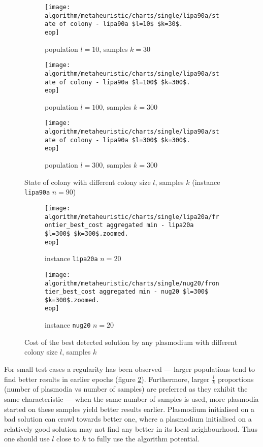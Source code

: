 \begin{figure}
  \centering

  \begin{subfigure}{\textwidth}
    \texttt{[image: algorithm/metaheuristic/charts/single/lipa90a/state of colony - lipa90a \$l=10\$ \$k=30\$.\\eop]}
    \caption{population $l=10$, samples $k=30$}
  \end{subfigure}
  \par\bigskip
  \begin{subfigure}{\textwidth}
    \texttt{[image: algorithm/metaheuristic/charts/single/lipa90a/state of colony - lipa90a \$l=100\$ \$k=300\$.\\eop]}
    \caption{population $l=100$, samples $k=300$}
  \end{subfigure}
  \par\bigskip
  \begin{subfigure}{\textwidth}
    \texttt{[image: algorithm/metaheuristic/charts/single/lipa90a/state of colony - lipa90a \$l=300\$ \$k=300\$.\\eop]}
    \caption{population $l=300$, samples $k=300$}
  \end{subfigure}

  \caption{State of colony with different colony size $l$, samples $k$ (instance \texttt{lipa90a} $n=90$)}
  \label{figure:am_state_of_colony}
\end{figure}


\begin{figure}
  \centering

  \begin{subfigure}{\textwidth}
    \texttt{[image: algorithm/metaheuristic/charts/single/lipa20a/frontier\_best\_cost aggregated min - lipa20a \$l=300\$ \$k=300\$.zoomed.\\eop]}
    \caption{instance \texttt{lipa20a} $n=20$}
  \end{subfigure}
  \par\bigskip
  \begin{subfigure}{\textwidth}
    \texttt{[image: algorithm/metaheuristic/charts/single/nug20/frontier\_best\_cost aggregated min - nug20 \$l=300\$ \$k=300\$.zoomed.\\eop]}
    \caption{instance \texttt{nug20} $n=20$}
  \end{subfigure}
  
  \caption{Cost of the best detected solution by any plasmodium with different colony size $l$, samples $k$}
  \label{figure:am_best_cost}
\end{figure}

For small test cases a regularity has been observed --- larger populations tend to find better results in earlier epochs (figure \ref{figure:am_best_cost}). Furthermore, larger $\frac{l}{k}$ proportions (number of plasmodia vs number of samples) are preferred as they exhibit the same characteristic --- when the same number of samples is used, more plasmodia started on these samples yield better results earlier. Plasmodium initialised on a bad solution can crawl towards better one, where a plasmodium initialised on a relatively good solution may not find any better in its local neighbourhood. Thus one should use $l$ close to $k$ to fully use the algorithm potential. 


